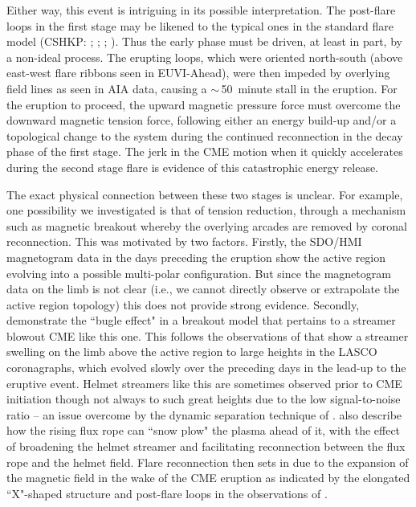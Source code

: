 \documentclass[namedreferences]{solarphysics}
\begin{document}
\begin{article}

Either way, this event is intriguing in its possible interpretation. The post-flare loops in the first stage may be likened to the typical ones in the standard flare model (CSHKP: ; ; ; ). Thus the early phase must be driven, at least in part, by a non-ideal process. The erupting loops, which were oriented north-south (above east-west flare ribbons seen in EUVI-Ahead), were then impeded by overlying field lines as seen in AIA data, causing a $\sim$\,50~minute stall in the eruption. For the eruption to proceed, the upward magnetic pressure force must overcome the downward magnetic tension force, following either an energy build-up and/or a topological change to the system during the continued reconnection in the decay phase of the first stage. The jerk in the CME motion when it quickly accelerates during the second stage flare is evidence of this catastrophic energy release.

The exact physical connection between these two stages is unclear. For example, one possibility we investigated is that of tension reduction, through a mechanism such as magnetic breakout whereby the overlying arcades are removed by coronal reconnection. This was motivated by two factors. Firstly, the SDO/HMI magnetogram data in the days preceding the eruption show the active region evolving into a possible multi-polar configuration. But since the magnetogram data on the limb is not clear (i.e., we cannot directly observe or extrapolate the active region topology) this does not provide strong evidence. Secondly,  demonstrate the ``bugle effect" in a breakout model that pertains to a streamer blowout CME like this one. This follows the observations of  that show a streamer swelling on the limb above the active region to large heights in the LASCO coronagraphs, which evolved slowly over the preceding days in the lead-up to the eruptive event. Helmet streamers like this are sometimes observed prior to CME initiation \cite{1993JGR....9813177H} though not always to such great heights due to the low signal-to-noise ratio -- an issue overcome by the dynamic separation technique of .  also describe how the rising flux rope can ``snow plow" the plasma ahead of it, with the effect of broadening the helmet streamer and facilitating reconnection between the flux rope and the helmet field. Flare reconnection then sets in due to the expansion of the magnetic field in the wake of the CME eruption as indicated by the elongated ``X"-shaped structure and post-flare loops in the observations of .


\end{article}
\end{document}
